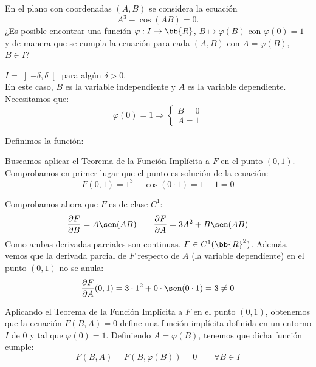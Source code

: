 \documentclass[12pt]{article}
\begin{document}
    \begin{ejercicio}
        En el plano con coordenadas $(A, B)$ se considera la ecuación
        \begin{equation*}
            A^3 - \cos(AB) = 0.
        \end{equation*}
        ¿Es posible encontrar una función $\varphi : I \to \bb{R}$, $B \mapsto \varphi(B)$ con $\varphi(0) = 1$ y de manera que se cumpla la ecuación para cada $(A, B)$ con $A = \varphi(B)$, $B \in I$?
        
        $I = \left] - \delta, \delta\right[$ para algún $\delta > 0$.\\

        En este caso, $B$ es la variable independiente y $A$ es la variable dependiente. Necesitamos que:
        \begin{equation*}
            \varphi(0)=1\Longrightarrow \left\{
                \begin{aligned}
                    B=0\\
                    A=1
                \end{aligned}
            \right.
        \end{equation*}
        
        Definimos la función:

        Buscamos aplicar el Teorema de la Función Implícita a $F$ en el punto $(0,1)$. Comprobamos en primer lugar que el punto es solución de la ecuación:
        \begin{equation*}
            F(0,1)=1^3-\cos(0\cdot1)=1-1=0
        \end{equation*}

        Comprobamos ahora que $F$ es de clase $C^1$:
        \begin{equation*}
            \dfrac{\partial F}{\partial B}=A\sen(AB)\qquad
            \dfrac{\partial F}{\partial A}=3A^2+B\sen(AB)
        \end{equation*}
        Como ambas derivadas parciales son continuas, $F\in C^1(\bb{R}^2)$.
        Además, vemos que la derivada parcial de $F$ respecto de $A$ (la variable dependiente) en el punto $(0,1)$ no se anula:
        \begin{equation*}
            \dfrac{\partial F}{\partial A}(0,1)=3\cdot1^2+0\cdot\sen(0\cdot1)=3\neq0
        \end{equation*}

        Aplicando el Teorema de la Función Implícita a $F$ en el punto $(0,1)$, obtenemos que la ecuación $F(B,A)=0$ define una función implícita
        dofinida en un entorno $I$ de $0$ y tal que $\varphi(0)=1$. Definiendo $A=\varphi(B)$, tenemos que dicha función cumple:
        \begin{equation*}
            F(B,A) = F(B,\varphi(B)) = 0\qquad \forall B\in I
        \end{equation*}
    \end{ejercicio}
\end{document}
